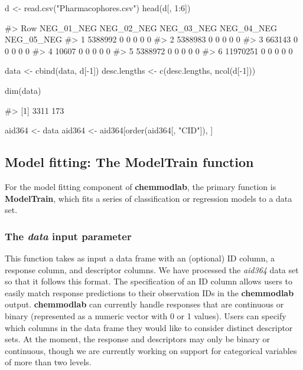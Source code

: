 \begin{Schunk}
\begin{Sinput}
d <- read.csv("Pharmacophores.csv")
head(d[, 1:6])
\end{Sinput}
\begin{Soutput}
#>        Row NEG_01_NEG NEG_02_NEG NEG_03_NEG NEG_04_NEG NEG_05_NEG
#> 1  5388992          0          0          0          0          0
#> 2  5388983          0          0          0          0          0
#> 3   663143          0          0          0          0          0
#> 4    10607          0          0          0          0          0
#> 5  5388972          0          0          0          0          0
#> 6 11970251          0          0          0          0          0
\end{Soutput}
\begin{Sinput}
data <- cbind(data, d[-1])
desc.lengths <- c(desc.lengths, ncol(d[-1]))

dim(data)
\end{Sinput}
\begin{Soutput}
#> [1] 3311  173
\end{Soutput}
\begin{Sinput}
aid364 <- data
aid364 <- aid364[order(aid364[, "CID"]), ]
\end{Sinput}
\end{Schunk}

\subsection{\texorpdfstring{Model fitting: The \textbf{ModelTrain}
function}{Model fitting: The ModelTrain function}}\label{model-fitting-the-modeltrain-function}

For the model fitting component of \textbf{chemmodlab}, the primary
function is \textbf{ModelTrain}, which fits a series of classification
or regression models to a data set.

\subsubsection{\texorpdfstring{The \textit{data} input
parameter}{The  input parameter}}\label{the-input-parameter}

This function takes as input a data frame with an (optional) ID column,
a response column, and descriptor columns. We have processed the
\emph{aid364} data set so that it follows this format. The specification
of an ID column allows users to easily match response predictions to
their observation IDs in the \textbf{chemmodlab} output.
\textbf{chemmodlab} can currently handle responses that are continuous
or binary (represented as a numeric vector with 0 or 1 values). Users
can specify which columns in the data frame they would like to consider
distinct descriptor sets. At the moment, the response and descriptors
may only be binary or continuous, though we are currently working on
support for categorical variables of more than two levels.

